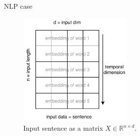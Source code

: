\documentclass{beamer}
\begin{document}
\begin{frame}{NLP case}

\begin{figure}[h]
\includegraphics[width=0.5\textwidth]{img/input}
\caption{Input sentence as a matrix $X \in \mathbb{R}^{n \times d}$. }
\end{figure}
\end{frame}
\end{document}
